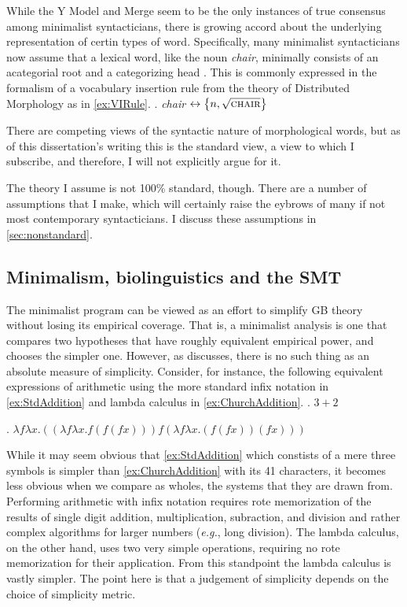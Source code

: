 \documentclass[MilwayThesis]{subfiles}
\begin{document}
While the Y Model and Merge seem to be the only instances of true consensus among minimalist syntacticians, there is growing accord about the underlying representation of certin types of word.
Specifically, many minimalist syntacticians now assume that a lexical word, like the noun \textit{chair}, minimally consists of an acategorial root and a categorizing head \parencite{borer2005name,marantz1997no}.
This is commonly expressed in the formalism of a vocabulary insertion rule from the theory of Distributed Morphology as in \cref{ex:VIRule}.
\ex.\label{ex:VIRule} \textit{chair} $\leftrightarrow \left\{ n, \sqrt{\textsc{chair}} \right\}$

There are competing views of the syntactic nature of morphological words, but as of this dissertation's writing this is the standard view, a view to which I subscribe, and therefore, I will not explicitly argue for it.

The theory I assume is not 100\% standard, though.
There are a number of assumptions that I make, which will certainly raise the eybrows of many if not most contemporary syntacticians.
I discuss these assumptions in \cref{sec:nonstandard}.

\subsection{Minimalism, biolinguistics and the SMT}
The minimalist program can be viewed as an effort to simplify GB theory without losing its empirical coverage.
That is, a minimalist analysis is one that compares two hypotheses that have roughly equivalent empirical power, and chooses the simpler one.
However, as \textcite{chomsky1965aspects} discusses, there is no such thing as an absolute measure of simplicity.
Consider, for instance, the following equivalent expressions of arithmetic using the more standard infix notation in \cref{ex:StdAddition} and lambda calculus in \cref{ex:ChurchAddition}.
\ex.\label{ex:StdAddition} $3 + 2$

\ex.\label{ex:ChurchAddition} $\lambda f \lambda x . ((\lambda f \lambda x . f(f(f x))) f(\lambda f \lambda x . (f(f x))(f x)))$

While it may seem obvious that \cref{ex:StdAddition} which constists of a mere three symbols is simpler than \cref{ex:ChurchAddition} with its 41 characters, it becomes less obvious when we compare as wholes, the systems that they are drawn from.
Performing arithmetic with infix notation requires rote memorization of the results of single digit addition, multiplication, subraction, and division and rather complex algorithms for larger numbers (\textit{e.g.}, long division).
The lambda calculus, on the other hand, uses two very simple operations, requiring no rote memorization for their application.
From this standpoint the lambda calculus is vastly simpler.
The point here is that a judgement of simplicity depends on the choice of simplicity metric.
\end{document}
